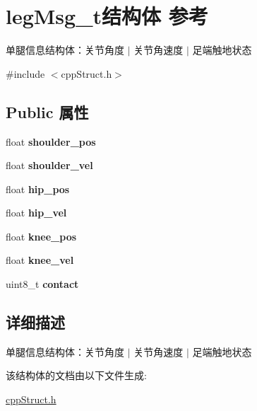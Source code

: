 \hypertarget{structlegMsg__t}{}\section{leg\+Msg\+\_\+t结构体 参考}
\label{structlegMsg__t}


单腿信息结构体：关节角度 $\vert$ 关节角速度 $\vert$ 足端触地状态  




{\ttfamily \#include $<$cpp\+Struct.\+h$>$}

\subsection*{Public 属性}
\begin{DoxyCompactItemize}
\item 
\mbox{\label{structlegMsg__t_a3d17060f41ef24a066fd7740c09b2746}} 
float {\bfseries shoulder\+\_\+pos}
\item 
\mbox{\label{structlegMsg__t_a1f84fee2b3100dd54d7c62fed2f8abcb}} 
float {\bfseries shoulder\+\_\+vel}
\item 
\mbox{\label{structlegMsg__t_ad220a3b2240d2f02892e55ba63aae34a}} 
float {\bfseries hip\+\_\+pos}
\item 
\mbox{\label{structlegMsg__t_ac2f9b486f29f62e986aa7374883d2d12}} 
float {\bfseries hip\+\_\+vel}
\item 
\mbox{\label{structlegMsg__t_afabb94594bc0911e39f10679fd1d7c88}} 
float {\bfseries knee\+\_\+pos}
\item 
\mbox{\label{structlegMsg__t_a68070ea8bab08b79547d7901883b0871}} 
float {\bfseries knee\+\_\+vel}
\item 
\mbox{\label{structlegMsg__t_ae40399945d9213b7c1974f57e82dd4d0}} 
uint8\+\_\+t {\bfseries contact}
\end{DoxyCompactItemize}


\subsection{详细描述}
单腿信息结构体：关节角度 $\vert$ 关节角速度 $\vert$ 足端触地状态 

该结构体的文档由以下文件生成\+:\begin{DoxyCompactItemize}
\item 
\hyperlink{cppStruct_8h}{cpp\+Struct.\+h}\end{DoxyCompactItemize}
